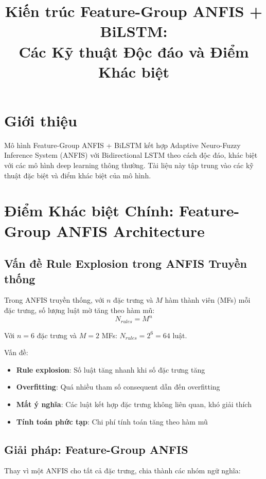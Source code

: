 \documentclass[12pt,a4paper]{article}
\title{Kiến trúc Feature-Group ANFIS + BiLSTM:\\Các Kỹ thuật Độc đáo và Điểm Khác biệt}
\author{}
\date{}
\begin{document}
\maketitle

\section{Giới thiệu}

Mô hình Feature-Group ANFIS + BiLSTM kết hợp Adaptive Neuro-Fuzzy Inference System (ANFIS) với Bidirectional LSTM theo cách độc đáo, khác biệt với các mô hình deep learning thông thường. Tài liệu này tập trung vào các kỹ thuật đặc biệt và điểm khác biệt của mô hình.

\section{Điểm Khác biệt Chính: Feature-Group ANFIS Architecture}

\subsection{Vấn đề Rule Explosion trong ANFIS Truyền thống}

Trong ANFIS truyền thống, với $n$ đặc trưng và $M$ hàm thành viên (MFs) mỗi đặc trưng, số lượng luật mờ tăng theo hàm mũ:
\begin{equation}
N_{rules} = M^n
\end{equation}

Với $n=6$ đặc trưng và $M=2$ MFs: $N_{rules} = 2^6 = 64$ luật.

Vấn đề:
\begin{itemize}
    \item \textbf{Rule explosion}: Số luật tăng nhanh khi số đặc trưng tăng
    \item \textbf{Overfitting}: Quá nhiều tham số consequent dẫn đến overfitting
    \item \textbf{Mất ý nghĩa}: Các luật kết hợp đặc trưng không liên quan, khó giải thích
    \item \textbf{Tính toán phức tạp}: Chi phí tính toán tăng theo hàm mũ
\end{itemize}

\subsection{Giải pháp: Feature-Group ANFIS}

Thay vì một ANFIS cho tất cả đặc trưng, chia thành các nhóm ngữ nghĩa:
\end{document}
